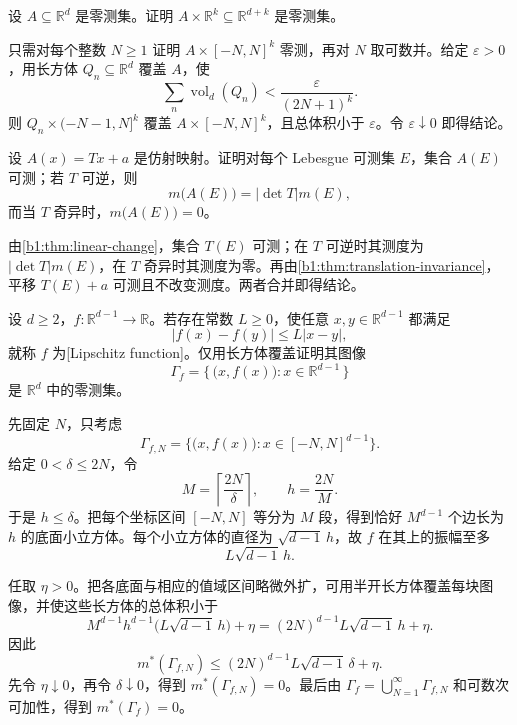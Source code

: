 \begin{exercise}\label{b1:ex:0306}
设 \(A\subseteq\mathbb R^d\) 是零测集。证明 \(A\times\mathbb R^k\subseteq\mathbb R^{d+k}\) 是零测集。
\end{exercise}
\begin{solution}
只需对每个整数 \(N\geq1\) 证明 \(A\times[-N,N]^k\) 零测，再对 \(N\) 取可数并。给定 \(\varepsilon>0\)，用长方体 \(Q_n\subseteq\mathbb R^d\) 覆盖 \(A\)，使
\[
\sum_n\operatorname{vol}_d(Q_n)<\frac{\varepsilon}{(2N+1)^k}.
\]
则 \(Q_n\times(-N-1,N]^k\) 覆盖 \(A\times[-N,N]^k\)，且总体积小于 \(\varepsilon\)。令 \(\varepsilon\downarrow0\) 即得结论。
\end{solution}

\begin{exercise}\label{b1:ex:0307}
设 \(A(x)=Tx+a\) 是仿射映射。证明对每个 Lebesgue 可测集 \(E\)，集合 \(A(E)\) 可测；若 \(T\) 可逆，则
\[
m\bigl(A(E)\bigr)=\lvert\det T\rvert m(E),
\]
而当 \(T\) 奇异时，\(m\bigl(A(E)\bigr)=0\)。
\end{exercise}
\begin{solution}
由\cref{b1:thm:linear-change}，集合 \(T(E)\) 可测；在 \(T\) 可逆时其测度为 \(\lvert\det T\rvert m(E)\)，在 \(T\) 奇异时其测度为零。再由\cref{b1:thm:translation-invariance}，平移 \(T(E)+a\) 可测且不改变测度。两者合并即得结论。
\end{solution}

\begin{exercise}\label{b1:ex:0308}
设 \(d\geq2\)，\(f:\mathbb R^{d-1}\to\mathbb R\)。若存在常数 \(L\geq0\)，使任意 \(x,y\in\mathbb R^{d-1}\) 都满足
\[
|f(x)-f(y)|\leq L|x-y|,
\]
就称 \(f\) 为[Lipschitz function]。仅用长方体覆盖证明其图像
\[
\Gamma_f=\{\,\bigl(x,f(x)\bigr):x\in\mathbb R^{d-1}\,\}
\]
是 \(\mathbb R^d\) 中的零测集。
\end{exercise}
\begin{solution}
先固定 \(N\)，只考虑
\[
\Gamma_{f,N}
=\{\bigl(x,f(x)\bigr):x\in[-N,N]^{d-1}\}.
\]
给定 \(0<\delta\leq2N\)，令
\[
M=\left\lceil\frac{2N}{\delta}\right\rceil,
\qquad
h=\frac{2N}{M}.
\]
于是 \(h\leq\delta\)。把每个坐标区间 \([-N,N]\) 等分为 \(M\) 段，得到恰好 \(M^{d-1}\) 个边长为 \(h\) 的底面小立方体。每个小立方体的直径为 \(\sqrt{d-1}\,h\)，故 \(f\) 在其上的振幅至多
\[
L\sqrt{d-1}\,h.
\]

任取 \(\eta>0\)。把各底面与相应的值域区间略微外扩，可用半开长方体覆盖每块图像，并使这些长方体的总体积小于
\[
M^{d-1}h^{d-1}
\bigl(L\sqrt{d-1}\,h\bigr)+\eta
=(2N)^{d-1}L\sqrt{d-1}\,h+\eta.
\]
因此
\[
m^*(\Gamma_{f,N})
\leq(2N)^{d-1}L\sqrt{d-1}\,\delta+\eta.
\]
先令 \(\eta\downarrow0\)，再令 \(\delta\downarrow0\)，得到
\(m^*(\Gamma_{f,N})=0\)。最后由
\(\Gamma_f=\bigcup_{N=1}^{\infty}\Gamma_{f,N}\)
和可数次可加性，得到 \(m^*(\Gamma_f)=0\)。
\end{solution}

